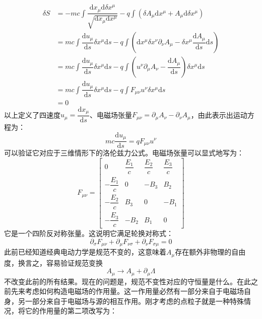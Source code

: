 \documentclass[12pt, a4paper, oneside]{ctexart}
\begin{document}
	\begin{equation}
		\begin{aligned}
		\delta S&=-mc\int \dfrac{\mathrm{d}x_{\mu}\mathrm{d}\delta x^{\mu}}{\sqrt{\mathrm{d}x_{\mu}\mathrm{d}x^{\mu}}}-q\int \left(\delta A_{\mu}\mathrm{d}x^{\mu}+A_{\mu}\mathrm{d}\delta x^{\mu}\right)\\
		&=mc\int \dfrac{\mathrm{d}u_{\mu}}{\mathrm{d}s}\delta x^{\mu}\mathrm{d}s-q\int\left(\mathrm{d}x^{\mu}\delta x^{\nu}\partial_{\nu}A_{\mu}-\delta x^{\mu}\dfrac{\mathrm{d}A_{\mu}}{\mathrm{d}s}\mathrm{d}s\right)\\
		&=mc\int \dfrac{\mathrm{d}u_{\mu}}{\mathrm{d}s}\delta x^{\mu}\mathrm{d}s-q\int\left(u^{\nu}\partial_{\mu}A_{\nu}-\dfrac{\mathrm{d}A_{\mu}}{\mathrm{d}s}\right)\delta x^{\mu}\mathrm{d}s\\
		&=mc\int \dfrac{\mathrm{d}u_{\mu}}{\mathrm{d}s}\delta x^{\mu}\mathrm{d}s-q\int F_{\mu\nu}u^{\nu}\delta x^{\mu}\mathrm{d}s\\
		&=0
		\end{aligned}
	\end{equation}
	\quad\quad 以上定义了四速度$u_{\mu}=\dfrac{\mathrm{d}x_{\mu}}{\mathrm{d}s}$、电磁场张量$F_{\mu\nu}=\partial_{\mu}A_{\nu}-\partial_{\nu}A_{\mu}$，由此表示出运动方程为：
	\begin{equation}
		mc\dfrac{\mathrm{d}u_{\mu}}{\mathrm{d}s}=qF_{\mu\nu}u^{\nu}
	\end{equation}
	\quad\quad 可以验证它对应于三维情形下的洛伦兹力公式。电磁场张量可以显式地写为：
	\[
	\renewcommand{\arraystretch}{1.5}
	F_{\mu\nu} =
	\begin{bmatrix}
		0 & \dfrac{E_1}{c} & \dfrac{E_2}{c} & \dfrac{E_3}{c} \\
		-\dfrac{E_1}{c} & 0 & -B_3 & B_2 \\
		-\dfrac{E_2}{c} & B_3 & 0 & -B_1 \\
		-\dfrac{E_3}{c} & -B_2 & B_1 & 0
	\end{bmatrix}
	\]
	\quad\quad 它是一个四阶反对称张量。这说明它满足轮换对称式：
	\begin{equation}
		\partial_{\sigma}F_{\mu\nu}+\partial_{\mu}F_{\nu\sigma}+\partial_{\nu}F_{\sigma\mu}=0
	\end{equation}
	\quad\quad 此前已经知道经典电动力学是规范不变的，这意味着$A_{\mu}$存在额外非物理的自由度，换言之，容易验证规范变换
	\begin{equation}
		A_{\mu}\to A_{\mu}+\partial_{\mu}\Lambda
	\end{equation}
	不改变此前的所有结果。现在的问题是，规范不变性对应的守恒量是什么。在此之前先来考虑如何构造电磁场的作用量。这一作用量必然有一部分来自于电磁场自身，另一部分来自于电磁场与源的相互作用。刚才考虑的点粒子就是一种特殊情况，将它的作用量的第二项改写为：
\end{document}

